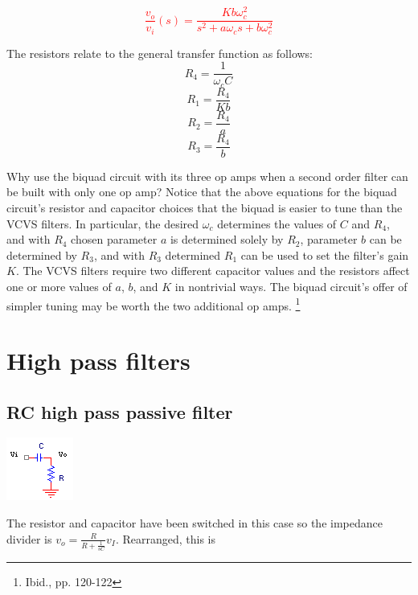 \textcolor{red}{
\begin{equation}
\frac{v_{o}}{v_{i}}(s) = \frac{Kb\omega_{c}^{2}}{s^{2} + a\omega_{c}s + b\omega_{c}^{2}}
\label{eq:2ndorderbiquadLPfilter}
\end{equation}
}

The resistors relate to the general transfer function as follows:
\begin{equation}
R_{4} = \frac{1}{\omega_{c}C}
\end{equation}
\begin{equation}
R_{1} = \frac{R_{4}}{Kb}
\end{equation}
\begin{equation}
R_{2} = \frac{R_{4}}{a}
\end{equation}
\begin{equation}
R_{3} = \frac{R_{4}}{b}
\end{equation}

Why use the biquad circuit with its three op amps when a second order filter can be built with only one op amp? Notice that the above equations for the biquad circuit's resistor and capacitor choices that the biquad is easier to tune than the VCVS filters. In particular, the desired $\omega_{c}$ determines the values of $C$ and $R_{4}$, and with $R_{4}$ chosen parameter $a$ is determined solely by $R_{2}$, parameter $b$ can be determined by $R_{3}$, and with $R_{3}$ determined $R_{1}$ can be used to set the filter's gain $K$. The VCVS filters require two different capacitor values and the resistors affect one or more values of $a$, $b$, and $K$ in nontrivial ways. The biquad circuit's offer of simpler tuning may be worth the two additional op amps.
\footnote{Ibid., pp. 120-122}

\section{High pass filters}

\subsection{RC high pass passive filter}
\begin{center}
	\includegraphics{schematics/rcHPfilter.PNG}
\end{center}
The resistor and capacitor have been switched in this case so the impedance divider is $v_{o} = \frac{R}{R+\frac{1}{sC}}v_{I}$. Rearranged, this is

